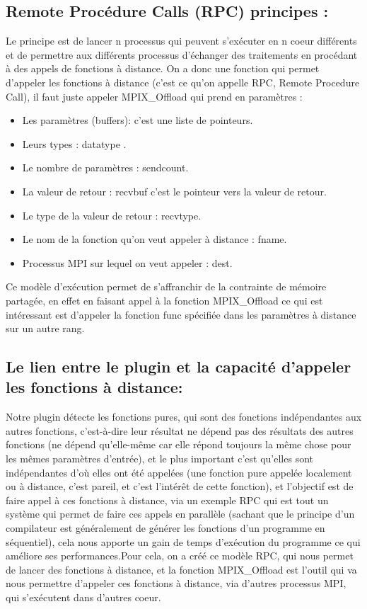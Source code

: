 \documentclass[12pt,titlepage]{article}
\begin{document}
\subsection{Remote Procédure Calls (RPC) principes :}
Le principe est de lancer n processus qui peuvent s'exécuter en n coeur différents et de permettre aux différents processus d'échanger des traitements en procédant à des appels de fonctions à distance. On a donc une fonction qui permet d'appeler les fonctions à distance (c'est ce qu'on appelle RPC, Remote Procedure Call), il faut juste appeler MPIX\_Offload qui prend en paramètres :

\begin{itemize}
\item Les paramètres (buffers): c'est une liste de pointeurs.
\item Leurs types : datatype .
\item Le nombre de paramètres : sendcount. 
\item La valeur de retour : recvbuf c'est le pointeur vers la valeur de retour.
\item Le type de la valeur de retour : recvtype.
\item Le nom de la fonction qu'on veut appeler à distance : fname.
\item Processus MPI sur lequel on veut appeler : dest.
\end{itemize}

Ce modèle d'exécution permet de s'affranchir de la contrainte de mémoire partagée, en effet en faisant appel à la fonction MPIX\_Offload ce qui est intéressant est d'appeler la fonction func spécifiée dans les paramètres à distance sur un autre rang.

\subsection{Le lien entre le plugin et la capacité d'appeler les fonctions à distance:}

Notre plugin détecte les fonctions pures, qui sont des fonctions indépendantes aux autres fonctions, c'est-à-dire leur résultat ne dépend pas des résultats des autres fonctions (ne dépend qu'elle-même car elle répond toujours la même chose pour les mêmes paramètres d'entrée), et le plus important c'est qu'elles sont indépendantes d'où elles ont été appelées (une fonction pure appelée localement ou à distance, c'est pareil, et c'est l'intérêt de cette fonction), et l'objectif est de faire appel à ces fonctions à distance, via un exemple RPC qui est tout un système qui permet de faire ces appels en parallèle (sachant que le principe d'un compilateur est généralement de générer les fonctions d'un programme en séquentiel), cela nous apporte un gain de temps d’exécution du programme ce qui améliore ses performances.Pour cela, on a créé ce modèle RPC, qui nous permet de lancer des fonctions à distance, et la fonction MPIX\_Offload est l'outil qui va nous permettre d'appeler ces fonctions à distance, via d'autres processus MPI, qui s'exécutent dans d'autres coeur.
\end{document}
